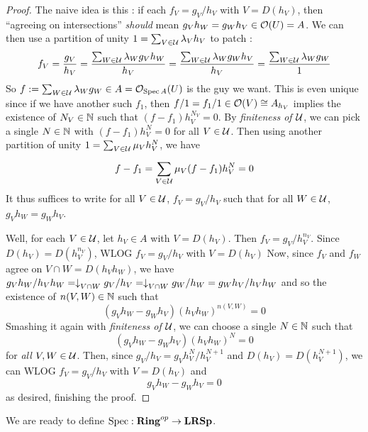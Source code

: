 \begin{proof}
  The naive idea is this : 
  if each $f_V = g_V / h_V$ with $V = D(h_V)$,
  then ``agreeing on intersections'' \emph{should} mean 
  $g_V h_W = g_W h_V \in \mathcal{O}(U) = A$.
  We can then use a partition of unity $1 = \sum_{V \in \mathcal{U}}^{} \lambda_V h_V$
  to patch : \[
    f_V = \frac{g_V}{h_V}
    = \frac{\sum_{W \in \mathcal{U}}^{} \lambda_W g_V h_W}{h_V}
    = \frac{\sum_{W \in \mathcal{U} }^{} \lambda_W g_W h_V}{h_V}
    = \frac{\sum_{W \in \mathcal{U}}^{} \lambda_W g_W}{1}
  \]
  So $f := \sum_{W \in \mathcal{U}}^{} \lambda_W g_W \in A = \mathcal{O}_{\operatorname{Spec} A}(U)$ 
  is the guy we want. 
  This is even unique since if we have another such $f_1$,
  then $f/1 = f_1 / 1 \in \mathcal{O}(V) \cong A_{h_V}$ implies
  the existence of $N_V \in \mathbb{N}$ such that $(f - f_1) h_V^{N_V} = 0$.
  By \emph{finiteness of $\mathcal{U}$},
  we can pick a single $N \in \mathbb{N}$ with 
  $(f - f_1) h_V^N = 0$ for all $V \in \mathcal{U}$.
  Then using another partition of unity $1 = \sum_{V \in \mathcal{U}}^{} \mu_V h_V^N$,
  we have \[
    f - f_1 = \sum_{V \in \mathcal{U}}^{} \mu_V (f - f_1) h_V^N = 0
  \]
  It thus suffices to write for all $V \in \mathcal{U}$,
  $f_V = g_V / h_V$ such that for all $W \in \mathcal{U}$, $g_V h_W = g_W h_V$.

  Well, for each $V \in \mathcal{U}$, let $h_V \in A$ with $V = D(h_V)$.
  Then $f_V = g_V / h_V^{n_V}$.
  Since $D(h_V) = D(h_V^{n_V})$, WLOG $f_V = g_V / h_V$ with $V = D(h_V)$
  Now, since $f_V$ and $f_W$ agree on $V \cap W = D(h_V h_W)$,
  we have $g_V h_W / h_V h_W = \downarrow_{V\cap W}^{} g_V / h_V
  = \downarrow_{V \cap W}^{} g_W / h_W = g_W h_V / h_V h_W$
  and so the existence of $n(V,W) \in \mathbb{N}$ such that
  \[
    (g_V h_W - g_W h_V) (h_V h_W)^{n(V,W)} = 0
  \]
  Smashing it again with \emph{finiteness of $\mathcal{U}$},
  we can choose a single $N \in \mathbb{N}$ such that 
  \[
    (g_V h_W - g_W h_V) (h_V h_W)^N = 0
  \]
  for \emph{all} $V, W \in \mathcal{U}$.
  Then, since $g_V / h_V = g_V h_V^{N} / h_V^{N+1} $
  and $D(h_V) = D(h_V^{N+1})$,
  we can WLOG $f_V = g_V / h_V$ with $V = D(h_V)$ and \[
    g_V h_W - g_W h_V = 0
  \]
  as desired, finishing the proof.
\end{proof}

\begin{rmk}
  We are ready to define $\operatorname{Spec} : \mathbf{Ring}^{op} \to \mathbf{LRSp}$.
\end{rmk}

